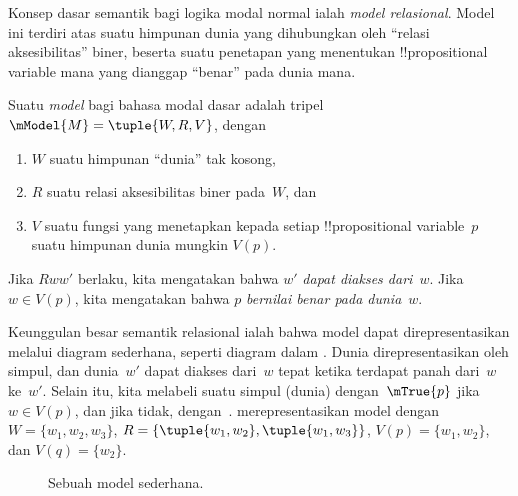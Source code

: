 \documentclass[../../../include/open-logic-section]{subfiles}
\begin{document}


Konsep dasar semantik bagi logika modal normal ialah \emph{model
relasional}. Model ini terdiri atas suatu himpunan dunia yang dihubungkan oleh
``relasi aksesibilitas'' biner, beserta suatu penetapan yang menentukan
!!{propositional variable} mana yang dianggap ``benar'' pada dunia mana.

\begin{defn}
  Suatu \emph{model} bagi bahasa modal dasar adalah tripel $\mModel{M}
  = \tuple{W, R, V}$, dengan
  \begin{enumerate}
  \item $W$ suatu himpunan ``dunia'' tak kosong,
  \item $R$ suatu relasi aksesibilitas biner pada~$W$, dan
  \item $V$ suatu fungsi yang menetapkan kepada setiap !!{propositional
    variable}~$p$ suatu himpunan dunia mungkin $V(p)$.
  \end{enumerate}
  Jika $Rww'$ berlaku, kita mengatakan bahwa $w'$ \emph{dapat diakses
    dari}~$w$. Jika $w \in V(p)$, kita mengatakan bahwa $p$ \emph{bernilai
    benar pada dunia}~$w$.
\end{defn}

Keunggulan besar semantik relasional ialah bahwa model dapat direpresentasikan
melalui diagram sederhana, seperti diagram dalam . Dunia
direpresentasikan oleh simpul, dan dunia~$w'$ dapat diakses dari~$w$ tepat
ketika terdapat panah dari~$w$ ke~$w'$. Selain itu, kita melabeli suatu simpul
(dunia) dengan~$\mTrue{p}$ jika $w \in V(p)$, dan jika tidak,
dengan~.  merepresentasikan model dengan
$W = \{w_1, w_2, w_3\}$, $R = \{\tuple{w_1, w_2},\tuple{w_1,
  w_3}\}$, $V(p) = \{w_1, w_2\}$, dan $V(q) = \{w_2\}$.

\begin{figure}
  \begin{center}
  \end{center}
  \caption{Sebuah model sederhana.}
\end{figure}
\end{document}
